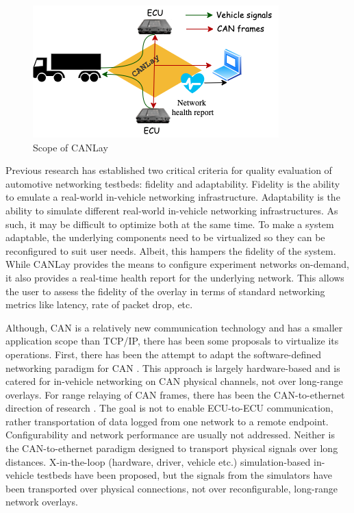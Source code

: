 \documentclass[letterpaper,twocolumn,10pt]{article}
\begin{document}
\begin{figure}[t!]
    \centering
    \includegraphics[width=\linewidth]{images/design_goal.drawio.png}
    \caption{Scope of CANLay}
    \label{fig:goal}
\end{figure}

Previous research \cite{tagarev_automotive_2021} has established two critical criteria for quality evaluation of automotive networking testbeds: fidelity and adaptability. Fidelity is the ability to emulate a real-world in-vehicle networking infrastructure. Adaptability is the ability to simulate different real-world in-vehicle networking infrastructures. As such, it may be difficult to optimize both at the same time. To make a system adaptable, the underlying components need to be virtualized so they can be reconfigured to suit user needs. Albeit, this hampers the fidelity of the system. While CANLay provides the means to configure experiment networks on-demand, it also provides a real-time health report for the underlying network. This allows the user to assess the fidelity of the overlay in terms of standard networking metrics like latency, rate of packet drop, etc.

Although, CAN is a relatively new communication technology and has a smaller application scope than TCP/IP, there has been some proposals to virtualize its operations. 
First, there has been the attempt to adapt the software-defined networking paradigm for CAN \cite{rotermund_requirements_2020,doering_retrofitting_nodate,grewe_bloomycan_2021}. This approach is largely hardware-based and is catered for in-vehicle networking on CAN physical channels, not over long-range overlays. For range relaying of CAN frames, there has been the CAN-to-ethernet direction of research \cite{johanson_relaying_2009,florian_polzlbauer_experience_2019}. The goal is not to enable ECU-to-ECU communication, rather transportation of data logged from one network to a remote endpoint. Configurability and network performance are usually not addressed. Neither is the CAN-to-ethernet paradigm designed to transport physical signals over long distances. 
X-in-the-loop (hardware, driver, vehicle etc.) simulation-based in-vehicle testbeds \cite{appel_safety_2020} have been proposed, but the signals from the simulators have been transported over physical connections, not over reconfigurable, long-range network overlays. 
\end{document}

